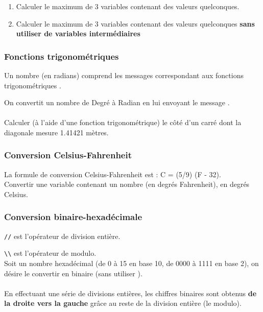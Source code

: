 \begin{enumerate}
\item Calculer le maximum de 3 variables  contenant des valeurs
quelconques.
\item Calculer le maximum de 3 variables  contenant des valeurs
quelconques {\bf sans utiliser de variables interm\'ediaires}
\end{enumerate}

\subsubsection{Fonctions trigonom\'etriques}

Un nombre (en radians) comprend les messages correspondant aux 
fonctions trigonom\'etriques .

On convertit un nombre de Degr\'e \`a Radian en lui envoyant
le message .

\paragraph{}
Calculer (\`a l'aide d'une fonction trigonom\'etrique) le c\^ot\'e
d'un carr\'e dont la diagonale mesure 1.41421 m\`etres.

\subsubsection{Conversion Celsius-Fahrenheit}

La formule de conversion Celsius-Fahrenheit est :
C = (5/9) (F - 32).\\
Convertir une variable contenant un nombre (en degr\'es Fahrenheit),
en degr\'es Celsius.

\subsubsection{Conversion binaire-hexad\'ecimale}

\verb|//| est l'op\'erateur de division enti\`ere.

\verb|\\| est l'op\'erateur de modulo.\\
Soit un nombre hexad\'ecimal (de 0 \`a 15 en base 10, de 0000 \`a 1111 en base 2),
on d\'esire le convertir en binaire
(sans utiliser ).

\paragraph{}
En effectuant une s\'erie de divisions enti\`eres, les chiffres binaires
sont obtenus {\bf de la droite vers la gauche} gr\^ace au reste de la division
enti\`ere (le modulo).

